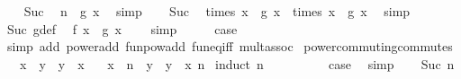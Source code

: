 \begin{isabellebody}
\ \ \isamarkupfalse%
\ Suc\ \isamarkupfalse%
\ {\isachardoublequoteopen}n\ {\isacharequal}{\kern0pt}\ g\ x{\isachardoublequoteclose}\ \isamarkupfalse%
\ simp\isanewline
\ \ \isamarkupfalse%
\ Suc\ \isamarkupfalse%
\ {\isachardoublequoteopen}times\ x\ {\isacharcircum}{\kern0pt}{\isacharcircum}{\kern0pt}\ g\ x\ {\isacharequal}{\kern0pt}\ times\ {\isacharparenleft}{\kern0pt}x\ {\isacharcircum}{\kern0pt}\ g\ x{\isacharparenright}{\kern0pt}{\isachardoublequoteclose}\ \isamarkupfalse%
\ simp\isanewline
\ \ \isamarkupfalse%
\ \isamarkupfalse%
\ Suc\ g{\isacharunderscore}{\kern0pt}def\ \isamarkupfalse%
\ {\isachardoublequoteopen}f\ x\ {\isacharequal}{\kern0pt}\ g\ x\ {\isacharplus}{\kern0pt}\ {}{\isachardoublequoteclose}\ \isamarkupfalse%
\ simp\isanewline
\ \ \isamarkupfalse%
\ \isamarkupfalse%
\ {\isacharquery}{\kern0pt}case\isanewline
\ \ \ \ \isamarkupfalse%
\ {\isacharparenleft}{\kern0pt}simp\ add{\isacharcolon}{\kern0pt}\ power{\isacharunderscore}{\kern0pt}add\ funpow{\isacharunderscore}{\kern0pt}add\ fun{\isacharunderscore}{\kern0pt}eq{\isacharunderscore}{\kern0pt}iff\ mult{\isachardot}{\kern0pt}assoc{\isacharparenright}{\kern0pt}\isanewline
{}\isamarkupfalse%
%
\endisatagproof
{\isafoldproof}%
%
\isadelimproof
\isanewline
%
\endisadelimproof
\isanewline
{}\isamarkupfalse%
\ power{\isacharunderscore}{\kern0pt}commuting{\isacharunderscore}{\kern0pt}commutes{\isacharcolon}{\kern0pt}\isanewline
\ \ \ {\isachardoublequoteopen}x\ {\isacharasterisk}{\kern0pt}\ y\ {\isacharequal}{\kern0pt}\ y\ {\isacharasterisk}{\kern0pt}\ x{\isachardoublequoteclose}\isanewline
\ \ \ {\isachardoublequoteopen}x\ {\isacharcircum}{\kern0pt}\ n\ {\isacharasterisk}{\kern0pt}\ y\ {\isacharequal}{\kern0pt}\ y\ {\isacharasterisk}{\kern0pt}\ x\ {\isacharcircum}{\kern0pt}n{\isachardoublequoteclose}\isanewline
%
\isadelimproof
%
\endisadelimproof
%
\isatagproof
{}\isamarkupfalse%
\ {\isacharparenleft}{\kern0pt}induct\ n{\isacharparenright}{\kern0pt}\isanewline
\ \ \isamarkupfalse%
\ {}\isanewline
\ \ \isamarkupfalse%
\ \isamarkupfalse%
\ {\isacharquery}{\kern0pt}case\ \isamarkupfalse%
\ simp\isanewline
{}\isamarkupfalse%
\isanewline
\ \ \isamarkupfalse%
\ {\isacharparenleft}{\kern0pt}Suc\ n{\isacharparenright}{\kern0pt}\isanewline

\end{isabellebody}
